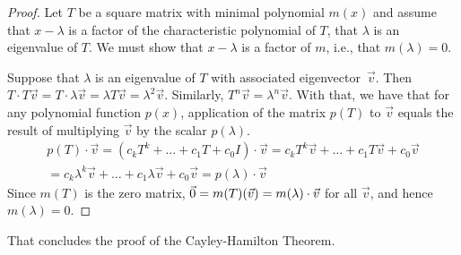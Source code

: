 \begin{proof}
Let \( T \) be a square matrix with minimal polynomial \( m(x) \) and 
assume that \( x-\lambda \) is a factor of the characteristic polynomial of 
\( T \), that \( \lambda \) is an eigenvalue of \( T \).
We must show that $x-\lambda$ is a factor of $m$, i.e., that 
$m(\lambda)=0$.

Suppose that $\lambda$ is an eigenvalue of $T$ with associated 
eigenvector~$\vec{v}$.
Then
$T\cdot T\vec{v}=T\cdot\lambda\vec{v}=\lambda T\vec{v}=\lambda^2\vec{v}$.
Similarly, $T^n\vec{v}=\lambda^n\vec{v}$.
With that, we have that 
for any polynomial function \( p(x) \), application of the matrix \( p(T) \)
to \( \vec{v} \) equals the result of multiplying \( \vec{v} \) by the scalar
\( p(\lambda) \).
\begin{multline*}
  p(T)\cdot\vec{v}
  =(c_kT^k+\dots+c_1T+c_0I)\cdot\vec{v}
  =c_kT^k\vec{v}+\dots+c_1T\vec{v}+c_0\vec{v}  \\
  =c_k\lambda^k\vec{v}+\dots+c_1\lambda\vec{v}+c_0\vec{v}
  =p(\lambda)\cdot\vec{v}
\end{multline*}
Since \( m(T) \) is the zero matrix,
\( \vec{0}=m(T)(\vec{v})=m(\lambda)\cdot\vec{v} \)
for all $\vec{v}$, and
hence \( m(\lambda)=0 \).
\end{proof}

That concludes the proof of the Cayley-Hamilton Theorem.

